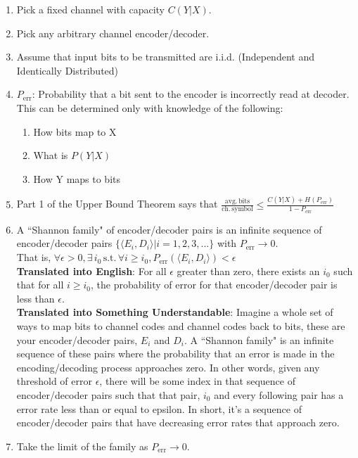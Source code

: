 \documentclass[11pt]{article}
\theoremstyle{definition}
\begin{document}
\begin{enumerate}
	\item Pick a fixed channel with capacity $C(Y|X)$. 
	\item Pick any arbitrary channel encoder/decoder. 
	\item Assume that input bits to be transmitted are i.i.d. (Independent and Identically Distributed) 
	\item $P_{\mathrm{err}}$: Probability that a bit sent to the encoder is incorrectly read at decoder. This can be determined only with knowledge of the following:
		\begin{enumerate}
			\item How bits map to X
			\item What is $P(Y|X)$
			\item How Y maps to bits
		\end{enumerate}
	\item Part 1 of the Upper Bound Theorem says that $\frac{\mathrm{avg. \, bits}}{\mathrm{ch. \, symbol}} \leq \frac{C(Y|X) + H(P_{\mathrm{err}})}{1 - P_{\mathrm{err}}}$
	\item A ``Shannon family" of encoder/decoder pairs is an infinite sequence of encoder/decoder pairs $\{\langle E_i, D_i \rangle |i=1,2,3,...\}$ with $P_{\mathrm{err}} \rightarrow 0$. \\That is, $\forall \epsilon > 0, \exists \, i_0 \, \mathrm{s.t.} \, \forall i \geq i_0, P_{\mathrm{err}}(\langle E_i,D_i \rangle ) < \epsilon$\\
	{\bf Translated into English}: For all $\epsilon$ greater than zero, there exists an $i_0$ such that for all $i \geq i_0$, the probability of error for that encoder/decoder pair is less than $\epsilon$.\\
	{\bf Translated into Something Understandable}: Imagine a whole set of ways to map bits to channel codes and channel codes back to bits, these are your encoder/decoder pairs, $E_i$ and $D_i$. A ``Shannon family" is an infinite sequence of these pairs where the probability that an error is made in the encoding/decoding process approaches zero. In other words, given any threshold of error $\epsilon$, there will be some index in that sequence of encoder/decoder pairs such that that pair, $i_0$ and every following pair has a error rate less than or equal to epsilon. In short, it's a sequence of encoder/decoder pairs that have decreasing error rates that approach zero.  
	\item Take the limit of the family as $P_{\mathrm{err}} \rightarrow 0$.
\end{enumerate}
\end{document}
